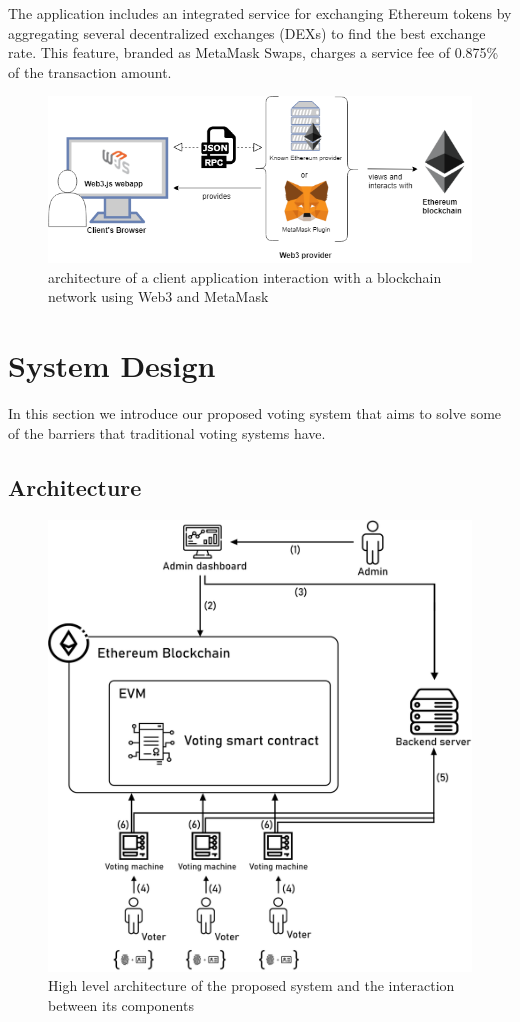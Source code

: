 The application includes an integrated service for exchanging Ethereum tokens by aggregating several decentralized exchanges (DEXs) to find the best exchange rate. This feature, branded as MetaMask Swaps, charges a service fee of 0.875\% of the transaction amount\cite{schroederCryptoWalletMetaMask2021}.

\begin{figure}[h]
	\centering
		\includegraphics[width=12cm]{images/chapter3/web3-architecture.png}
		\caption{{\footnotesize architecture of a client application interaction with a blockchain network using Web3 and MetaMask}}
\end{figure}

\section{System Design}

In this section we introduce our proposed voting system that aims to solve some of the barriers that traditional voting systems have.

\subsection{Architecture}

\begin{figure}[H]
	\centering
		\includegraphics[width=12cm]{images/chapter3/architecture.png}
		\caption{{\footnotesize High level architecture of the proposed system and the interaction between its components}}
\end{figure}

